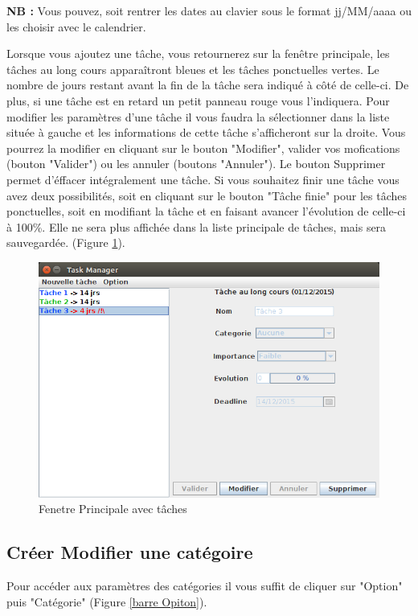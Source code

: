 \documentclass{article}
\begin{document}
\textbf{NB :} Vous pouvez, soit rentrer les dates au clavier sous le format jj/MM/aaaa ou les choisir avec le calendrier.
\newline
\par
Lorsque vous ajoutez une tâche, vous retournerez sur la fenêtre principale, les tâches au long cours apparaîtront bleues et les tâches ponctuelles vertes. Le nombre de jours restant avant la fin de la tâche sera indiqué à côté de celle-ci.
De plus, si une tâche est en retard un petit panneau rouge vous l'indiquera.
Pour modifier les paramètres d'une tâche il vous faudra la sélectionner dans la liste située à gauche et  les informations de cette tâche s'afficheront sur la droite. Vous pourrez la modifier en cliquant sur le bouton "Modifier", valider vos mofications (bouton "Valider") ou les annuler (boutons "Annuler"). Le bouton Supprimer permet d'éffacer intégralement une tâche. Si vous souhaitez finir une tâche vous avez deux possibilités, soit en cliquant sur le bouton "Tâche finie" pour les tâches ponctuelles, soit en modifiant la tâche et en faisant avancer l'évolution de celle-ci à 100\%. Elle ne sera plus affichée dans la liste principale de tâches, mais sera sauvegardée. (Figure \ref{Fenetre principale 2}).

\begin{figure}[!h]
	\centering
	\includegraphics[scale=0.34]{images/CaptureMainDIsplay3.png}
	\caption{Fenetre Principale avec tâches}
	\label{Fenetre principale 2}
\end{figure}

\clearpage
\subsection{Créer Modifier une catégoire}
Pour accéder aux paramètres des catégories il vous suffit de cliquer sur "Option" puis "Catégorie" (Figure \ref{barre Opiton}).
\end{document}
